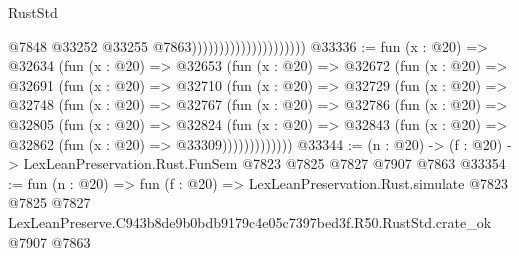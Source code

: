 \begin{lexlean}{RustStd}
\begin{coremodule}
                                              @7848
                                              @33252
                                              @33255
                                              @7863)))))))))))))))))))))
@33336 := fun (x : @20) =>
  @32634
    (fun (x : @20) =>
    @32653
      (fun (x : @20) =>
      @32672
        (fun (x : @20) =>
        @32691
          (fun (x : @20) =>
          @32710
            (fun (x : @20) =>
            @32729
              (fun (x : @20) =>
              @32748
                (fun (x : @20) =>
                @32767
                  (fun (x : @20) =>
                  @32786
                    (fun (x : @20) =>
                    @32805
                      (fun (x : @20) =>
                      @32824
                        (fun (x : @20) =>
                        @32843 (fun (x : @20) => @32862 (fun (x : @20) => @33309)))))))))))))
@33344 := (n : @20) -> (f : @20) -> LexLeanPreservation.Rust.FunSem @7823 @7825 @7827 @7907 @7863
@33354 := fun (n : @20) =>
  fun (f : @20) =>
  LexLeanPreservation.Rust.simulate
    @7823
    @7825
    @7827
    LexLeanPreserve.C943b8de9b0bdb9179c4e05c7397bed3f.R50.RustStd.crate_ok
    @7907
    @7863
\end{coremodule}
\end{lexlean}
